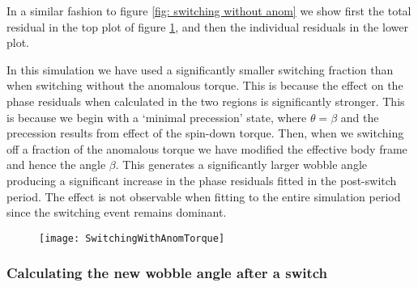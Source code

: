 In a similar fashion to figure \ref{fig: switching without anom} we show first
the total residual in the top plot of figure \ref{fig: switching with anom}, and
then the individual residuals in the lower plot.

In this simulation we have used a significantly smaller switching fraction 
than when switching without the anomalous torque. This is because the effect 
on the phase residuals when calculated in the two regions is significantly
stronger. This is because we begin with a `minimal precession' state, where
$\theta = \beta$ and the precession results from effect of the spin-down torque.
Then, when we switching off a fraction of the anomalous torque we have modified
the effective body frame and hence the angle $\beta$. This generates a significantly
larger wobble angle producing a significant increase in the phase residuals
fitted in the post-switch period. The effect is not observable when fitting
to the entire simulation period since the switching event remains dominant.

\begin{figure}[htb]
\texttt{[image: SwitchingWithAnomTorque]}
\caption{}
\label{fig: switching with anom}
\end{figure}

\subsubsection{Calculating the new wobble angle after a switch}



